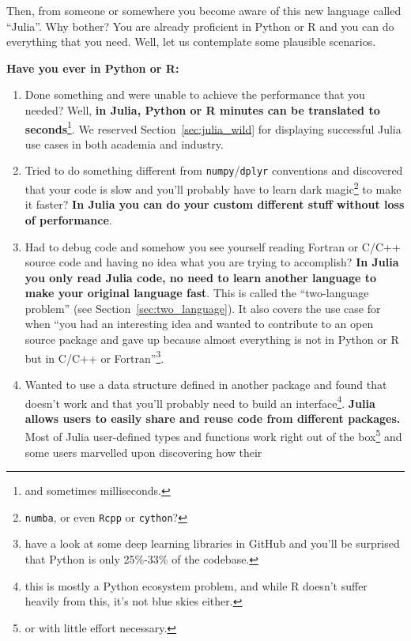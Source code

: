 \documentclass[
  notoc %
]{tufte-book}
\newcommand{\passthrough}[1]{#1}
\begin{document}
Then, from someone or somewhere you become aware of this new language
called ``Julia''. Why bother? You are already proficient in Python or R
and you can do everything that you need. Well, let us contemplate some
plausible scenarios.

\textbf{Have you ever in Python or R:}

\begin{enumerate}
\def\labelenumi{\arabic{enumi}.}
\item
  Done something and were unable to achieve the performance that you
  needed? Well, \textbf{in Julia, Python or R minutes can be translated
  to seconds}\footnote{and sometimes milliseconds.}. We reserved
  Section~\ref{sec:julia_wild} for displaying successful Julia use cases
  in both academia and industry.
\item
  Tried to do something different from
  \passthrough{\lstinline!numpy!}/\passthrough{\lstinline!dplyr!}
  conventions and discovered that your code is slow and you'll probably
  have to learn dark magic\footnote{\passthrough{\lstinline!numba!}, or
    even \passthrough{\lstinline!Rcpp!} or
    \passthrough{\lstinline!cython!}?} to make it faster? \textbf{In
  Julia you can do your custom different stuff without loss of
  performance}.
\item
  Had to debug code and somehow you see yourself reading Fortran or
  C/C++ source code and having no idea what you are trying to
  accomplish? \textbf{In Julia you only read Julia code, no need to
  learn another language to make your original language fast}. This is
  called the ``two-language problem'' (see
  Section~\ref{sec:two_language}). It also covers the use case for when
  ``you had an interesting idea and wanted to contribute to an open
  source package and gave up because almost everything is not in Python
  or R but in C/C++ or Fortran''\footnote{have a look at some deep
    learning libraries in GitHub and you'll be surprised that Python is
    only 25\%-33\% of the codebase.}.
\item
  Wanted to use a data structure defined in another package and found
  that doesn't work and that you'll probably need to build an
  interface\footnote{this is mostly a Python ecosystem problem, and
    while R doesn't suffer heavily from this, it's not blue skies
    either.}. \textbf{Julia allows users to easily share and reuse code
  from different packages.} Most of Julia user-defined types and
  functions work right out of the box\footnote{or with little effort
    necessary.} and some users marvelled upon discovering how their

\end{enumerate}
\end{document}
